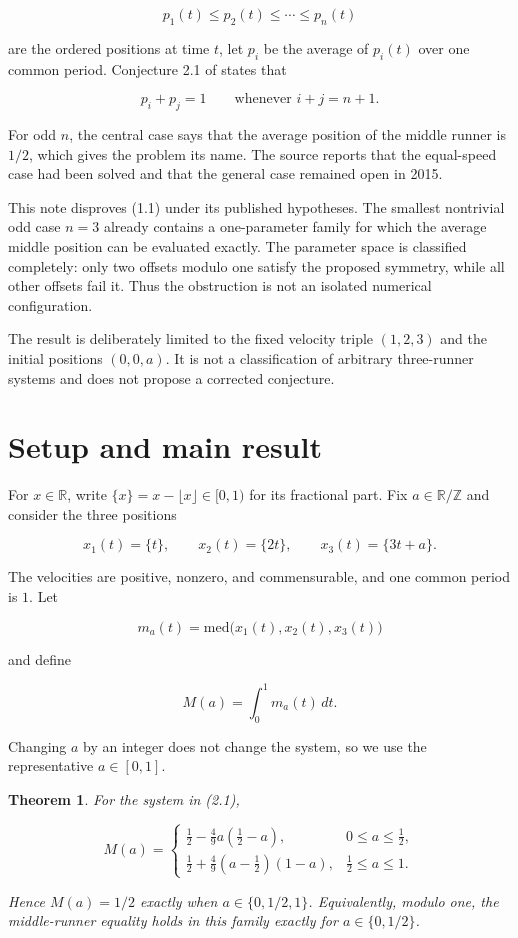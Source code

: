 \documentclass[11pt]{article}
\newtheorem{theorem}{Theorem}[section]
\numberwithin{equation}{section}
\begin{document}
\nopagebreak[4]
\[
p_1(t)\leq p_2(t)\leq\cdots\leq p_n(t)
\]

are the ordered positions at time $t$, let $p_i$ be the average of $p_i(t)$
over one common period. Conjecture 2.1 of \cite{aim2015} states that

\nopagebreak[4]
\[
p_i+p_j=1\qquad\text{whenever }i+j=n+1.
\tag{1.1}
\]

For odd $n$, the central case says that the average position of the middle
runner is $1/2$, which gives the problem its name. The source reports that the
equal-speed case had been solved and that the general case remained open in
2015.

This note disproves (1.1) under its published hypotheses. The smallest
nontrivial odd case $n=3$ already contains a one-parameter family for which the average
middle position can be evaluated exactly. The parameter space is classified
completely: only two offsets modulo one satisfy the proposed symmetry, while
all other offsets fail it. Thus the obstruction is not an isolated numerical
configuration.

The result is deliberately limited to the fixed velocity triple $(1,2,3)$ and
the initial positions $(0,0,a)$. It is not a classification of arbitrary
three-runner systems and does not propose a corrected conjecture.

\section{Setup and main result}


For $x\in\mathbb R$, write $\{x\}=x-\lfloor x\rfloor\in[0,1)$ for its
fractional part. Fix $a\in\mathbb R/\mathbb Z$ and consider the three
positions

\nopagebreak[4]
\[
x_1(t)=\{t\},\qquad
x_2(t)=\{2t\},\qquad
x_3(t)=\{3t+a\}.
\tag{2.1}
\]

The velocities are positive, nonzero, and commensurable, and one common
period is $1$. Let

\nopagebreak[4]
\[
m_a(t)=\mathrm{med}\bigl(x_1(t),x_2(t),x_3(t)\bigr)
\]

and define

\nopagebreak[4]
\[
M(a)=\int_0^1m_a(t)\,dt.
\tag{2.2}
\]

Changing $a$ by an integer does not change the system, so we use the
representative $a\in[0,1]$.

\Needspace{0.25\textheight}
\begin{theorem}

For the system in (2.1),

\nopagebreak[4]
\[
M(a)=
\begin{cases}
\displaystyle \frac12-\frac49a\left(\frac12-a\right),
  &0\leq a\leq\frac12,\\[6pt]
\displaystyle \frac12+\frac49\left(a-\frac12\right)(1-a),
  &\frac12\leq a\leq1.
\end{cases}
\tag{2.3}
\]

Hence $M(a)=1/2$ exactly when $a\in\{0,1/2,1\}$. Equivalently, modulo one,
the middle-runner equality holds in this family exactly for
$a\in\{0,1/2\}$.

\end{theorem}
\end{document}
